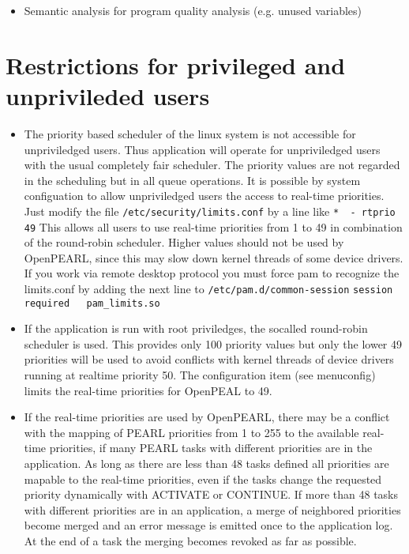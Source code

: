 \documentclass[oneside,10pt]{scrbook}
\begin{document}
\begin{itemize}
\item Semantic analysis for program quality analysis (e.g. unused variables)
\end{itemize}

\section{Restrictions for privileged and unprivileded users}
\begin{itemize}
\item The priority based scheduler of the linux system is not
   accessible for unpriviledged users. Thus application will operate for 
   unpriviledged users with
   the usual completely fair scheduler. The priority values are 
   not regarded in the scheduling but in all queue operations.
   It is possible by system configuation to allow unpriviledged users
   the access to real-time priorities. Just modify the file
   \verb|/etc/security/limits.conf| by a line like\newline
   \verb|*  - rtprio 49|\newline
   This allows all users to use real-time priorities from 1 to 49 in combination of 
   the round-robin scheduler.
   Higher values should not be used by OpenPEARL, since this may 
   slow down kernel threads of some device drivers.
   \newline
   If you work via remote desktop protocol you must force pam to
   recognize the limits.conf by adding the next line to \verb|/etc/pam.d/common-session|
   \newline
   \verb|session    required   pam_limits.so|
\item If the application is run with root priviledges, the socalled 
  round-robin scheduler is used. This provides only 100 priority values but
  only the lower 49 priorities will be used to avoid conflicts with
  kernel threads of device drivers running at realtime priority 50.
  The configuration item (see menuconfig) limits the real-time priorities for
  OpenPEAL to 49.
\item If the real-time priorities are used by OpenPEARL, there may be a conflict with the
  mapping of  
  PEARL priorities from 1 to 255 to the available real-time priorities, if many PEARL tasks 
  with different priorities are in the application. As long as there are less than 48 tasks 
  defined all priorities are mapable to the real-time priorities, even if the tasks change the 
  requested priority dynamically with ACTIVATE or CONTINUE.
  If more than 48 tasks with different priorities are in an application, 
  a merge of neighbored priorities become merged and an error message is emitted once 
  to the application log. At the end of a task the merging becomes revoked as far as possible.


\end{itemize}
\end{document}

